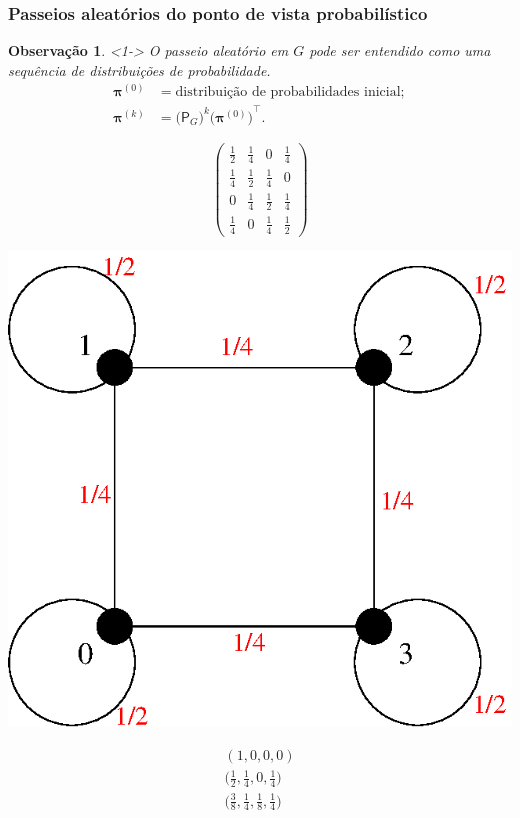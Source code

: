 \documentclass{beamer}
\def\MMp{\mathrm{.}} %
\def\MMpv{\mathrm{;}} %
\def\vetor#1{\boldsymbol{#1}}
\def\matriz#1{\mathsf{#1}}
\def\transp#1{{#1}^{\scriptscriptstyle \top}}
\theoremstyle{teoaxicorlem}
\theoremstyle{defnotnom}
\newtheorem{Obs}{Observação}
\begin{document}
\begin{frame}
  \frametitle{Passeios aleatórios do ponto de vista probabilístico}
  \begin{Obs}<1->
    O passeio aleatório em $G$
    pode ser entendido como uma sequência
    de distribuições de probabilidade.
    \begin{equation*}
      \begin{aligned}
        {\vetor \pi}^{(0)} &=
        \text{distribuição de probabilidades
          inicial}\MMpv\\
        {\vetor \pi}^{(k)} &= {\bigl({\matriz P}_G\bigr)}^k
        \transp{\bigl({{\vetor \pi}^{(0)}}\bigr)}\MMp
      \end{aligned}
    \end{equation*}
  \end{Obs}
  \vfill\pause
  \parbox{.3\linewidth}{
    \begin{equation*}
      \begin{pmatrix}
        \textstyle\frac12 & \textstyle\frac14 & 0 & \textstyle\frac14
        \\
        \textstyle\frac14 & \textstyle\frac12 & \textstyle\frac14 & 0
        \\
        0 & \textstyle\frac14 & \textstyle\frac12 & \textstyle\frac14
        \\
        \textstyle\frac14 & 0 & \textstyle\frac14 & \textstyle\frac12
    \end{pmatrix}
    \end{equation*}
  }\hfill
  \parbox{.3\linewidth}{
    \centering
    \includegraphics[width=.25\textwidth]{d2p.eps}
  }\hfill
  \parbox{.3\linewidth}{
    \begin{equation*}
      \begin{gathered}
        (1,0,0,0) \\
        \bigl(\textstyle\frac12, \textstyle\frac14, 0,
        \textstyle\frac14\bigr)
        \\
        \bigl(\textstyle\frac38, \textstyle\frac14, \textstyle\frac18,
        \textstyle\frac14\bigr)
      \end{gathered}
    \end{equation*}
  }
\end{frame}
\end{document}
